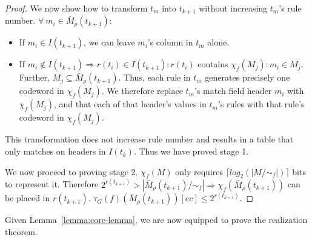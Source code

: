 \begin{proof}
We now show how to transform $t_m$ into $t_{k+1}$ without increasing $t_m$'s rule number. $\forall\ m_i \in \bar{M}_\rho(t_{k+1})$:

\begin{itemize}
 \item If $m_i \in I(t_{k+1})$, we can leave $m_i$'s column in $t_m$ alone.

 \item If $m_i \notin I(t_{k+1}) \Rightarrow r(t_i) \in I(t_{k+1}) : r(t_i)$ contains $\chi_f(M_j) : m_i \in M_j$. Further, $M_j \subseteq \bar{M}_\rho(t_{k+1})$. Thus, each rule in $t_m$ generates precisely one codeword in $\chi_f(M_j)$. We therefore replace $t_m$'s match field header $m_i$ with $\chi_f(M_j)$, and that each of that header's values in $t_m$'s rules with that rule's codeword in $\chi_f(M_j)$.
\end{itemize}

This transformation does not increase rule number and results in a table that only matches on headers in $I(t_k)$. Thus we have proved stage 1.


We now proceed to proving stage 2. $\chi_f(M)$ only requires $\lceil log_2(|M/\sim_f|) \rceil$ bits to represent it. Therefore $2^{r(t_{k+1})} > |\bar{M}_\rho(t_{k+1})/\sim_f| \Rightarrow \chi_f(\bar{M}_\rho(t_{k+1}))$ can be placed in $r(t_{k+1})$. $\tau_G(f)(\bar{M}_\rho(t_{k+1}))[ec] \leq 2^{r(t_{k+1})}$.
\end{proof}

Given Lemma~\ref{lemma:core-lemma}, we are now equipped to prove the realization theorem.

